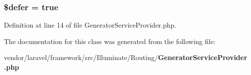 \subsubsection[{\$defer}]{\setlength{\rightskip}{0pt plus 5cm}\$defer = true\hspace{0.3cm}{\ttfamily [protected]}}\label{class_illuminate_1_1_routing_1_1_generator_service_provider_af035ee3a0e66d50f2a013040b1d320b8}


Definition at line 14 of file Generator\+Service\+Provider.\+php.



The documentation for this class was generated from the following file\+:\begin{DoxyCompactItemize}
\item 
vendor/laravel/framework/src/\+Illuminate/\+Routing/{\bf Generator\+Service\+Provider.\+php}\end{DoxyCompactItemize}
